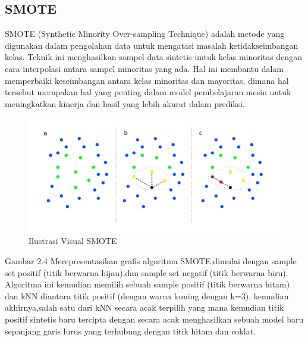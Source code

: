 \subsection{SMOTE}
\label{subsec:SMOTE}
SMOTE (Synthetic Minority Over-sampling Technique) adalah metode yang digunakan dalam pengolahan data untuk mengatasi masalah ketidakseimbangan kelas. Teknik ini menghasilkan sampel data sintetis untuk kelas minoritas dengan cara interpolasi antara sampel minoritas yang ada. Hal ini membantu dalam memperbaiki keseimbangan antara kelas minoritas dan mayoritas, dimana hal tersebut merupakan hal yang penting dalam model pembelajaran mesin untuk meningkatkan kinerja dan hasil yang lebih akurat dalam prediksi.


\begin{figure} [H] \centering
  \includegraphics[scale=0.5]{gambar/2_2_5.png}
  \caption{Ilustrasi Visual SMOTE}
  \label{fig:SMOTE}
\end{figure}

Gambar 2.4 Merepresentasikan grafis algoritma SMOTE,dimulai dengan sample set positif (titik berwarna hijau),dan sample set negatif (titik berwarna biru). Algoritma ini kemudian memilih sebuah sample positif (titik berwarna hitam) dan kNN diantara titik positif (dengan warna kuning dengan k=3), kemudian akhirnya,salah satu dari kNN secara acak terpilih yang mana kemudian titik positif sintetis baru tercipta dengan secara acak menghasilkan sebuah model baru sepanjang garis lurus yang terhubung dengan titik hitam dan coklat\parencite{schubach2017imbalance}.
